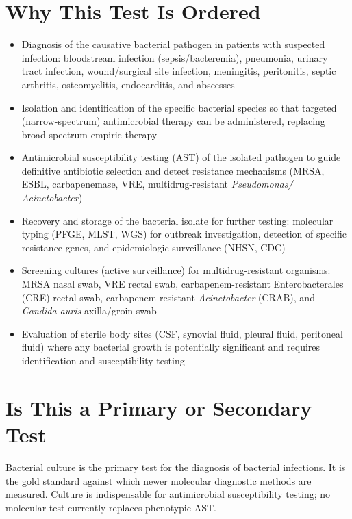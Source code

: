 \section*{Why This Test Is Ordered}
\begin{itemize}
  \item Diagnosis of the causative bacterial pathogen in patients with suspected infection: bloodstream infection (sepsis/bacteremia), pneumonia, urinary tract infection, wound/surgical site infection, meningitis, peritonitis, septic arthritis, osteomyelitis, endocarditis, and abscesses
  \item Isolation and identification of the specific bacterial species so that targeted (narrow-spectrum) antimicrobial therapy can be administered, replacing broad-spectrum empiric therapy
  \item Antimicrobial susceptibility testing (AST) of the isolated pathogen to guide definitive antibiotic selection and detect resistance mechanisms (MRSA, ESBL, carbapenemase, VRE, multidrug-resistant \textit{Pseudomonas/ Acinetobacter})
  \item Recovery and storage of the bacterial isolate for further testing: molecular typing (PFGE, MLST, WGS) for outbreak investigation, detection of specific resistance genes, and epidemiologic surveillance (NHSN, CDC)
  \item Screening cultures (active surveillance) for multidrug-resistant organisms: MRSA nasal swab, VRE rectal swab, carbapenem-resistant Enterobacterales (CRE) rectal swab, carbapenem-resistant \textit{Acinetobacter} (CRAB), and \textit{Candida auris} axilla/groin swab
  \item Evaluation of sterile body sites (CSF, synovial fluid, pleural fluid, peritoneal fluid) where any bacterial growth is potentially significant and requires identification and susceptibility testing
\end{itemize}

\section*{Is This a Primary or Secondary Test}
Bacterial culture is the primary test for the diagnosis of bacterial infections. It is the gold standard against which newer molecular diagnostic methods are measured. Culture is indispensable for antimicrobial susceptibility testing; no molecular test currently replaces phenotypic AST.

